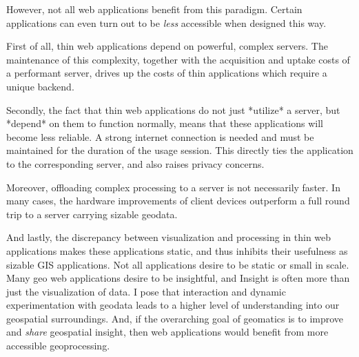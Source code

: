 However, not all web applications benefit from this paradigm. Certain applications can even turn out to be \emph{less} accessible when designed this way. 


First of all, thin web applications depend on powerful, complex servers. The maintenance of this complexity, together with the acquisition and uptake costs of a performant server, drives up the costs of thin applications which require a unique backend. 


Secondly, the fact that thin web applications do not just *utilize* a server, but *depend* on them to function normally, means that these applications will become less reliable. A strong internet connection is needed and must be maintained for the duration of the usage session. This directly ties the application to the corresponding server, and also raises privacy concerns. 


Moreover, offloading complex processing to a server is not necessarily faster. In many cases, the hardware improvements of client devices outperform a full round trip to a server carrying sizable geodata. 


And lastly, the discrepancy between visualization and processing in thin web applications makes these applications static, and thus inhibits their usefulness as sizable GIS applications. 
Not all applications desire to be static or small in scale. 
Many geo web applications desire to be insightful, and Insight is often more than just the visualization of data. 
I pose that interaction and dynamic experimentation with geodata leads to a higher level of understanding into our geospatial surroundings. 
And, if the overarching goal of geomatics is to improve and \emph{share} geospatial insight, then web applications would benefit from more accessible geoprocessing.


